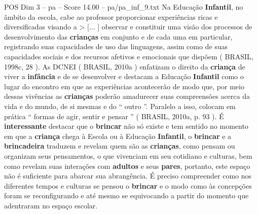 \begin{textsample}{POS Dim 3 – pa – Score 14.00 – pa/pa\_inf\_9.txt}
Na Educação \textbf{Infantil}, no âmbito da escola, cabe ao professor proporcionar experiências ricas e diversificadas visando a > [... ] observar e constituir uma visão dos processos de desenvolvimento das \textbf{crianças} em conjunto e de cada uma em particular, registrando suas capacidades de uso das linguagens, assim como de suas capacidades sociais e dos recursos afetivos e emocionais que dispõem ( BRASIL, 1998c, 28 ).
As DCNEI ( BRASIL, 2010a ) enfatizam o direito da \textbf{criança} de viver a \textbf{infância} e de se desenvolver e destacam a Educação \textbf{Infantil} como o lugar do encontro em que as experiências acontecerão de modo que, por meio dessas vivências as \textbf{crianças} poderão amadurecer suas compreensões acerca da vida e do mundo, de si mesmas e do “ outro ”.
Paralelo a isso, colocam em prática “ formas de agir, sentir e pensar ” ( BRASIL, 2010a, p. 93 ).
É \textbf{interessante} destacar que o \textbf{brincar} não só existe e tem sentido no momento em que a \textbf{criança} chega à Escola ou à Educação \textbf{Infantil}, o \textbf{brincar} e a \textbf{brincadeira} traduzem e revelam quem são as \textbf{crianças}, como pensam ou organizam seus pensamentos, o que vivenciam em seu cotidiano e culturas, bem como revelam suas interações com \textbf{adultos} e seus \textbf{pares}, portanto, este espaço não é suficiente para abarcar sua abrangência.
É preciso compreender como nos diferentes tempos e culturas se pensou o \textbf{brincar} e o modo como às concepções foram se reconfigurando e até mesmo se equivocando a partir do momento que adentraram no espaço escolar.

\end{textsample}
